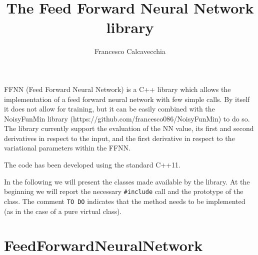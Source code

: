 \documentclass[11pt,a4paper,twoside]{article}
\title{The Feed Forward Neural Network library}
\author{Francesco Calcavecchia}
\begin{document}
\maketitle

FFNN (Feed Forward Neural Network) is a C++ library which allows the implementation of a feed forward neural network with few simple calls.
By itself it does not allow for training, but it can be easily combined with the NoisyFunMin library (https://github.com/francesco086/NoisyFunMin) to do so.
The library currently support the evaluation of the NN value, its first and second derivatives in respect to the input, and the first derivative in respect to the variational parameters within the FFNN.

The code has been developed using the standard C++11.

In the following we will present the classes made available by the library.
At the beginning we will report the necessary \verb+#include+ call and the prototype of the class.
The comment \verb+TO DO+ indicates that the method needs to be implemented (as in the case of a pure virtual class).


\section{FeedForwardNeuralNetwork}
\label{sec:NoisyFunction}
\end{document}
